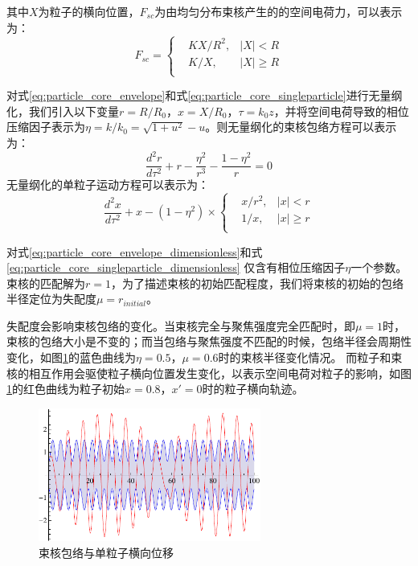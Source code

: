 其中$X$为粒子的横向位置，${F}_{sc}$为由均匀分布束核产生的的空间电荷力，可以表示为：
\begin{equation}
{{F}_{sc}}=\left\{
        \begin{aligned}
        & KX/{{R}^{2}}, &\left| X \right|<R \\
        & K/X,          &\left| X \right|\ge R \\
        \end{aligned} \right.
\end{equation}

对式\ref{eq:particle_core_envelope}和式\ref{eq:particle_core_singleparticle}进行无量纲化，我们引入以下变量$r=R/R_0$，$x=X/R_0$，$\tau = k_0 z $，并将空间电荷导致的相位压缩因子表示为$\eta = k/k_0 = \sqrt{1+u^2}-u$。则无量纲化的束核包络方程可以表示为：
\begin{equation}
    \label{eq:particle_core_envelope_dimensionless}
    \frac{{{d}^{2}}r}{d{{\tau}^{2}}}+r-\frac{{{\eta }^{2}}}{{{r}^{3}}}-\frac{1-{\eta}^2}{r}=0
\end{equation}
无量纲化的单粒子运动方程可以表示为：
\begin{equation}
    \label{eq:particle_core_singleparticle_dimensionless}
    \frac{{{d}^{2}}x}{d{{\tau}^{2}}}+x-(1-{\eta}^2) \times \left\{
        \begin{aligned}
        & x/{{r}^{2}}, &\left| x \right|<r \\
        & 1/x,         &\left| x \right|\ge r \\
        \end{aligned} \right.
\end{equation}

对式\ref{eq:particle_core_envelope_dimensionless}和式\ref{eq:particle_core_singleparticle_dimensionless}
仅含有相位压缩因子$\eta$一个参数。束核的匹配解为$r=1$，为了描述束核的初始匹配程度，我们将束核的初始的包络半径定位为失配度$\mu = r_{initial}$。

失配度会影响束核包络的变化。当束核完全与聚焦强度完全匹配时，即$\mu = 1$时，束核的包络大小是不变的；而当包络与聚焦强度不匹配的时候，包络半径会周期性变化，如图\ref{fig:particle_core_envelope}的蓝色曲线为$\eta = 0.5$，$\mu = 0.6$时的束核半径变化情况。
而粒子和束核的相互作用会驱使粒子横向位置发生变化，以表示空间电荷对粒子的影响，如图\ref{fig:particle_core_envelope}的红色曲线为粒子初始$x=0.8$，$x'=0$时的粒子横向轨迹。

\begin{figure}[!tbh]
    \centering
    \includegraphics[width=0.65\textwidth]{Img/particle_core_envelope.pdf}
    \caption{束核包络与单粒子横向位移}
    \label{fig:particle_core_envelope}
\end{figure}

